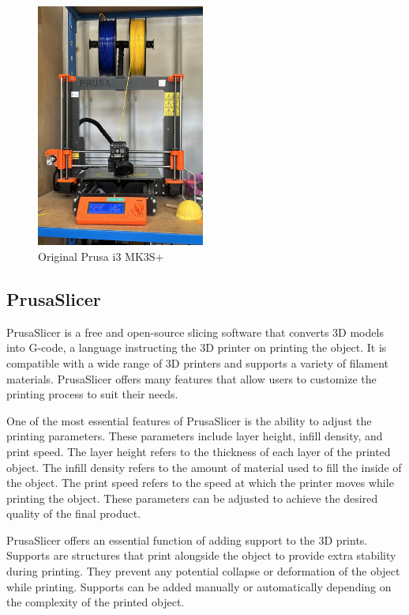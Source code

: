 \begin{figure}
    \centering
    \includegraphics[height=8cm]{texs/Part1/chapter1/image/prusa.jpg}
    \caption{Original Prusa i3 MK3S+}
    \label{fig:prusa_slicer_mk3}
\end{figure}

\subsection{PrusaSlicer}
\label{subsec:prusa_slicer}

PrusaSlicer is a free and open-source slicing software that converts 3D models into G-code, a language instructing the 3D printer on printing the object. It is compatible with a wide range of 3D printers and supports a variety of filament materials. PrusaSlicer offers many features that allow users to customize the printing process to suit their needs.

One of the most essential features of PrusaSlicer is the ability to adjust the printing parameters. These parameters include layer height, infill density, and print speed. The layer height refers to the thickness of each layer of the printed object. The infill density refers to the amount of material used to fill the inside of the object. The print speed refers to the speed at which the printer moves while printing the object. These parameters can be adjusted to achieve the desired quality of the final product.

PrusaSlicer offers an essential function of adding support to the 3D prints. Supports are structures that print alongside the object to provide extra stability during printing. They prevent any potential collapse or deformation of the object while printing. Supports can be added manually or automatically depending on the complexity of the printed object.

